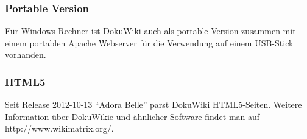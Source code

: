 \subsubsection{Portable Version}
Für Windows-Rechner ist DokuWiki auch als portable Version zusammen mit einem portablen Apache Webserver für die Verwendung auf einem USB-Stick vorhanden.
\subsubsection{HTML5}
Seit Release 2012-10-13 ``Adora Belle'' parst DokuWiki HTML5-Seiten. 
\linebreak\linebreak 
Weitere Information über DokuWikie und \"ahnlicher Software findet man auf http://www.wikimatrix.org/.
